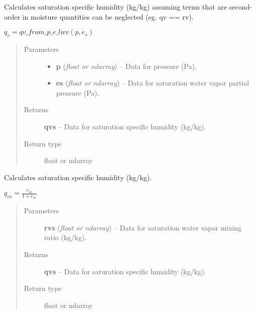 \documentclass[letterpaper,10pt,english]{sphinxmanual}
\begin{document}

\begin{fulllineitems}
\label{atmos:atmos.equations.qvs_from_p_es_lwv}
Calculates saturation specific humidity (kg/kg) assuming terms that are second-
order in moisture quantities can be neglected (eg. qv == rv).

\(q_v = qv\_from\_p\_e\_lwv(p, e_s)\)
\begin{quote}\begin{description}
\item[{Parameters}] \leavevmode\begin{itemize}
\item {} 
\textbf{p} (\emph{float or ndarray}) -- Data for pressure (Pa).

\item {} 
\textbf{es} (\emph{float or ndarray}) -- Data for saturation water vapor partial pressure (Pa).

\end{itemize}

\item[{Returns}] \leavevmode
\textbf{qvs} --
Data for saturation specific humidity (kg/kg).

\item[{Return type}] \leavevmode
float or ndarray

\end{description}\end{quote}

\end{fulllineitems}


\begin{fulllineitems}
\label{atmos:atmos.equations.qvs_from_rvs}
Calculates saturation specific humidity (kg/kg).

\(q_{vs} = \frac{r_{vs}}{1+r_{vs}}\)
\begin{quote}\begin{description}
\item[{Parameters}] \leavevmode
\textbf{rvs} (\emph{float or ndarray}) -- Data for saturation water vapor mixing ratio (kg/kg).

\item[{Returns}] \leavevmode
\textbf{qvs} --
Data for saturation specific humidity (kg/kg).

\item[{Return type}] \leavevmode
float or ndarray

\end{description}\end{quote}

\end{fulllineitems}
\end{document}
